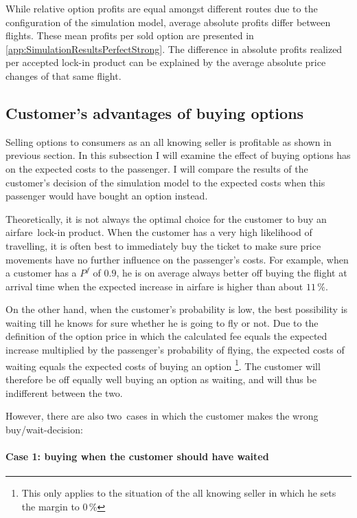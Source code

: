 
While relative option profits are equal amongst different routes due to the configuration of the simulation model, average absolute profits differ between flights. These mean profits per sold option are presented in \autoref{app:SimulationResultsPerfectStrong}. The difference in absolute profits realized per accepted lock-in product can be explained by the average absolute price changes of that same flight.


\subsection{Customer's advantages of buying options}
Selling options to consumers as an all knowing seller is profitable as shown in previous section. In this subsection I will examine the effect of buying options has on the expected costs to the passenger. I will compare the results of the customer's decision of the simulation model to the expected costs when this passenger would have bought an option instead.

Theoretically, it is not always the optimal choice for the customer to buy an airfare~lock-in product. When the customer has a very high likelihood of travelling, it is often best to immediately buy the ticket to make sure price movements have no further influence on the passenger's costs. For example, when a customer has a $P^f$ of $0.9$, he is on average always better off buying the flight at arrival time when the expected increase in airfare is higher than about $11\,\%$.

On the other hand, when the customer's probability is low, the best possibility is waiting till he knows for sure whether he is going to fly or not. Due to the definition of the option price in which the calculated fee equals the expected increase multiplied by the passenger's probability of flying, the expected costs of waiting equals the expected costs of buying an option \footnote{This only applies to the situation of the all knowing seller in which he sets the margin to $0\,\%$}. The customer will therefore be off equally well buying an option as waiting, and will thus be indifferent between the two.

However, there are also two~cases in which the customer makes the wrong buy/wait-decision:

\paragraph{Case 1: buying when the customer should have waited}

